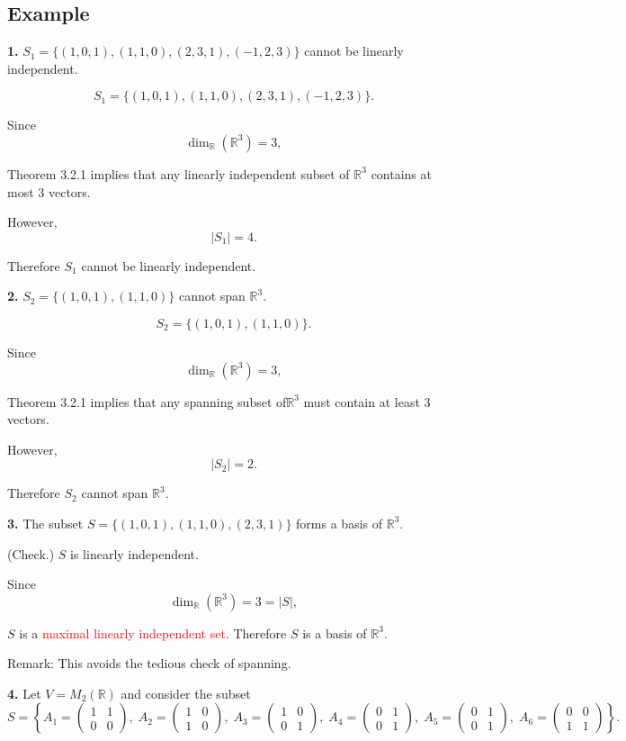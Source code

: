 \documentclass[12pt]{article}
\begin{document}
\subsection{Example}

\textbf{1.} 
$S_1=\{(1,0,1),(1,1,0),(2,3,1),(-1,2,3)\}$ cannot be linearly independent.

\[
S_1=\{(1,0,1),(1,1,0),(2,3,1),(-1,2,3)\}.
\]

Since
\[
\dim_{\mathbb R}(\mathbb R^3)=3,
\]

Theorem 3.2.1 implies that any linearly independent subset of $\mathbb R^3$ contains at most $3$ vectors.

However,
\[
|S_1|=4.
\]

Therefore $S_1$ cannot be linearly independent.

\bigskip

\textbf{2.}
$S_2=\{(1,0,1),(1,1,0)\}$ cannot span $\mathbb{R}^3$.

\[
S_2=\{(1,0,1),(1,1,0)\}.
\]

Since
\[
\dim_{\mathbb R}(\mathbb R^3)=3,
\]

Theorem 3.2.1 implies that any spanning subset of$\mathbb R^3$ must contain at least $3$ vectors.

However,
\[
|S_2|=2.
\]

Therefore $S_2$ cannot span $\mathbb R^3$.

\bigskip

\textbf{3.}
The subset $S=\{(1,0,1),(1,1,0),(2,3,1)\}$ forms a basis of $\mathbb{R}^3$.

(Check.) $S$ is linearly independent.

Since
\[
\dim_{\mathbb R}(\mathbb R^3)=3=|S|,
\]

$S$ is a \textcolor{red}{maximal linearly independent set}. Therefore $S$ is a basis of $\mathbb R^3$.

Remark: This avoids the tedious check of spanning.

\newpage

\textbf{4.}
Let $V=M_2(\mathbb{R})$ and consider the subset
\[
S=
\left\{
A_1=
\begin{pmatrix}
1&1\\
0&0
\end{pmatrix},
\;
A_2=
\begin{pmatrix}
1&0\\
1&0
\end{pmatrix},
\;
A_3=
\begin{pmatrix}
1&0\\
0&1
\end{pmatrix},
\;
A_4=
\begin{pmatrix}
0&1\\
0&1
\end{pmatrix},
\;
A_5=
\begin{pmatrix}
0&1\\
0&1
\end{pmatrix},
\;
A_6=
\begin{pmatrix}
0&0\\
1&1
\end{pmatrix}
\right\}.
\]
\end{document}
